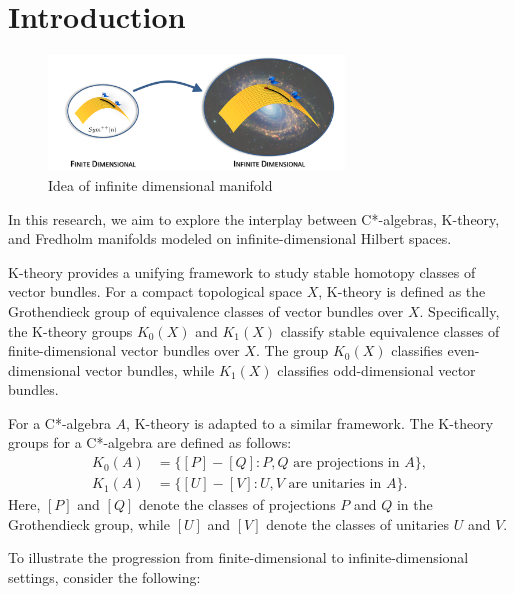 \documentclass[11pt, twoside, a4paper]{article}
\theoremstyle{mytheoremstyle}
\begin{document}
\newpage
{}  %
\setcounter{page}{1} %
\section{Introduction}
\begin{figure}[h!]
\centering
\includegraphics[width=0.7\textwidth]{manifold.png}
\caption{Idea of infinite dimensional manifold}
\end{figure}
In this research, we aim to explore the interplay between C*-algebras, K-theory, and Fredholm manifolds modeled on infinite-dimensional Hilbert spaces.

K-theory provides a unifying framework to study stable homotopy classes of vector bundles. For a compact topological space \( X \), K-theory is defined as the Grothendieck group of equivalence classes of vector bundles over \( X \). Specifically, the K-theory groups \( K_{0}(X) \) and \( K_{1}(X) \) classify stable equivalence classes of finite-dimensional vector bundles over \( X \). The group \( K_{0}(X) \) classifies even-dimensional vector bundles, while \( K_{1}(X) \) classifies odd-dimensional vector bundles.

For a C*-algebra \( A \), K-theory is adapted to a similar framework. The K-theory groups for a C*-algebra are defined as follows:
\begin{align*}
    K_{0}(A) &= \{[P] - [Q] : P, Q \text{ are projections in } A\}, \\
    K_{1}(A) &= \{[U] - [V] : U, V \text{ are unitaries in } A\}.
\end{align*}
Here, \( [P] \) and \( [Q] \) denote the classes of projections \( P \) and \( Q \) in the Grothendieck group, while \( [U] \) and \( [V] \) denote the classes of unitaries \( U \) and \( V \).

To illustrate the progression from finite-dimensional to infinite-dimensional settings, consider the following:
\end{document}
